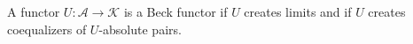 A functor $U: \mathcal{A} \rightarrow \mathcal{K}$ is a Beck functor if $U$ creates limits and if $U$ creates coequalizers of $U$-absolute pairs.
